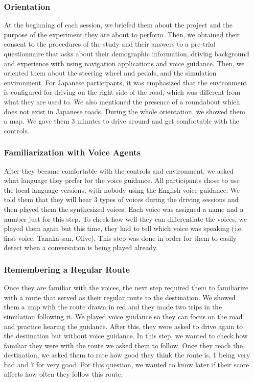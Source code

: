 \subsubsection{Orientation} 
At the beginning of each session, we briefed them about the project and the purpose of the experiment they are about to perform. Then, we obtained their consent to the procedures of the study and their answers to a pre-trial questionnaire that asks about their demographic information, driving background and experience with using navigation applications and voice guidance. Then, we oriented them about the steering wheel and pedals, and the simulation environment. For Japanese participants, it was emphasized that the environment is configured for driving on the right side of the road, which was different from what they are used to. We also mentioned the presence of a roundabout which does not exist in Japanese roads. During the whole orientation, we showed them a map. We gave them 3 minutes to drive around and get comfortable with the controls. 

\subsubsection{Familiarization with Voice Agents} 
After they became comfortable with the controls and environment, we asked what language they prefer for the voice guidance. All participants chose to use the local language versions, with nobody using the English voice guidance. We told them that they will hear 3 types of voices during the driving sessions and then played them the synthesized voices. Each voice was assigned a name and a number just for this step. To check how well they can differentiate the voices, we played them again but this time, they had to tell which voice was speaking (i.e. first voice, Tanaka-san, Olive). This step was done in order for them to easily detect when a conversation is being played already.

\subsubsection{Remembering a Regular Route}
Once they are familiar with the voices, the next step required them to familiarize with a route that served as their regular route to the destination. We showed them a map with the route drawn in red and they made two trips in the simulation following it. We played voice guidance so they can focus on the road and practice hearing the guidance. After this, they were asked to drive again to the destination but without voice guidance. In this step, we wanted to check how familiar they were with the route we asked them to follow. Once they reach the destination, we asked them to rate how good they think the route is, 1 being very bad and 7 for very good. For this question, we wanted to know later if their score affects how often they follow this route.

